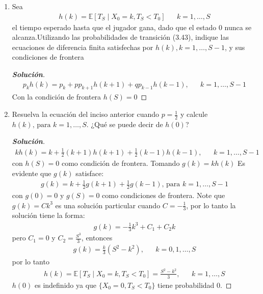 \documentclass[12pt, letterpaper]{article}
\newenvironment{manualtheorem}[1]{%
  \renewcommand\themanualtheoreminner{#1}%
  \manualtheoreminner
}{\endmanualtheoreminner}
\newenvironment{solucion}
  {\renewcommand\qedsymbol{$\square$}\begin{proof}[\textbf{Solución}]}
  {\end{proof}}
\begin{document}
\begin{manualtheorem}{3.2}
\begin{enumerate}
        \item Sea
        \begin{align*}
            h(k)=\mathbb{E}[T_S\mid X_0=k,T_S<T_0] & & k=1,\dots,S
        \end{align*}
        el tiempo esperado hasta que el jugador gana, dado que el estado 0 nunca se alcanza.Utilizando las probabilidades de transición (3.43), indique las ecuaciones de diferencia finita satisfechas por $h(k), k=1,\dots,S-1$, y sus condiciones de frontera
        \begin{solucion}
            \begin{align*}
                p_kh(k)=p_k+pp_{k+1}h(k+1)+qp_{k-1}h(k-1), & & k=1,\dots,S-1
            \end{align*}
            Con la condición de frontera $h(S)=0$
        \end{solucion}
        
        \item Resuelva la ecuación del inciso anterior cuando $p=\frac{1}{2}$ y calcule $h(k)\textrm{, para }k=1,\dots,S$. ¿Qué se puede decir de $h(0)$?
        \begin{solucion}
            \begin{align*}
                kh(k)=k+\frac{1}{2}(k+1)h(k+1)+\frac{1}{2}(k-1)h(k-1), & &  k=1,\dots,S-1
            \end{align*}
            con $h(S)=0$ como condición de frontera. Tomando $g(k)=kh(k)$ Es evidente que $g(k)$ satisface:
            \begin{align*}
                g(k)=k+\frac{1}{2}g(k+1)+\frac{1}{2}g(k-1)\textrm{, para }k=1,\dots,S-1
            \end{align*}
            con $g(0)=0$ y $g(S)=0$ como condiciones de frontera. Note que $g(k)=Ck^3$ es una solución particular cuando $C=-\frac{1}{3}$, por lo tanto la solución tiene la forma:
            \begin{align*}
                g(k)=-\frac{1}{3}k^3+C_1+C_2k
            \end{align*}
            pero $C_1=0$ y $C_2=\frac{S^3}{3}$, entonces
            \begin{align*}
                g(k)=\frac{k}{3}(S^2-k^2), & & k=0,1,\dots,S
            \end{align*}
            por lo tanto
            \begin{align*}
                h(k)=\mathbb{E}[T_S\mid X_0=k,T_S<T_0]=\frac{S^2-k^2}{3}, & & k=1,\dots,S
            \end{align*}
            $h(0)$ es indefinido ya que $\{X_0=0,T_S<T_0 \}$ tiene probabilidad 0.
        \end{solucion}
    \end{enumerate}
    \end{manualtheorem}
    
\end{document}
